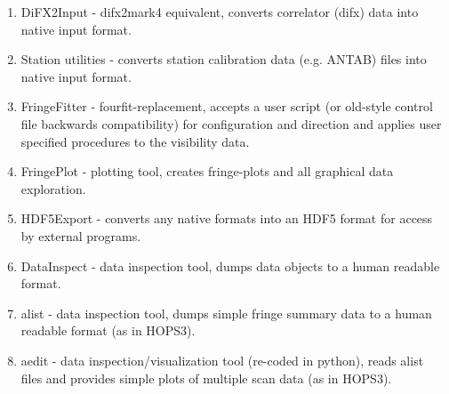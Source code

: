 \documentclass[hidelinks]{article}
\begin{document}
\begin{enumerate}
 \item DiFX2Input  - difx2mark4 equivalent, converts correlator (difx) data into native input format.
 \item Station utilities  - converts station calibration data (e.g. ANTAB) files into native input format.
 \item FringeFitter - fourfit-replacement, accepts a user script (or old-style control file backwards compatibility) for configuration and direction and applies user specified procedures to the visibility data.
 \item FringePlot  - plotting tool, creates fringe-plots and all graphical data exploration.
 \item HDF5Export  - converts any native formats into an HDF5 format for access by external programs.
 \item DataInspect - data inspection tool, dumps data objects to a human readable format.
 \item alist - data inspection tool, dumps simple fringe summary data to a human readable format (as in HOPS3).
 \item aedit - data inspection/visualization tool (re-coded in python), reads alist files and provides simple plots of multiple scan data (as in HOPS3).
 \end{enumerate}

 

%
%
\newpage
\addtocounter{section}{1}
\renewcommand{\refname}{\thesection. References}
%
\end{document}

